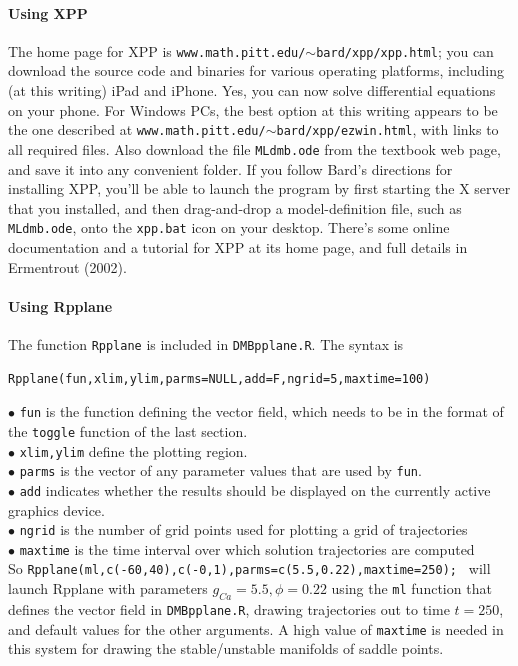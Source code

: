 \documentclass [11pt]{article}
\newcommand{\blst}{\vspace{-0.035in} \begin{lstlisting}}
\newcommand{\ttt}[1]{\texttt{#1}}
\numberwithin{exercise}{section}
\begin{document}
\paragraph{Using XPP} The home page for XPP is \ttt{www.math.pitt.edu/$\sim$bard/xpp/xpp.html}; you
can download the source code and binaries for various operating platforms, including (at this
writing) iPad and iPhone. Yes, you can now solve differential equations on your phone. 
For Windows PCs, the best option at this writing appears to be 
the one described at \ttt{www.math.pitt.edu/$\sim$bard/xpp/ezwin.html}, with links to all required files. 
Also download the file \ttt{MLdmb.ode} from the textbook web page, and save it into any convenient folder.  
If you follow Bard's directions for installing XPP, you'll be able to launch the program by first starting
the X server that you installed, and then drag-and-drop a model-definition file, such as \ttt{MLdmb.ode}, onto the \ttt{xpp.bat} icon on your desktop. There's some online documentation and a tutorial for XPP at its home page, and full details in
Ermentrout (2002). 

\paragraph{Using Rpplane} The function \ttt{Rpplane} is included in \ttt{DMBpplane.R}. The syntax is
\blst
Rpplane(fun,xlim,ylim,parms=NULL,add=F,ngrid=5,maxtime=100)
\end{lstlisting}
$\bullet$ \ttt{fun} is the function defining the vector field, which needs to be in the format of 
the \ttt{toggle} function of the last section. \\
$\bullet$ \ttt{xlim,ylim} define the plotting region. \\
$\bullet$ \ttt{parms} is the vector of any parameter values that are used by \ttt{fun}. \\
$\bullet$ \ttt{add} indicates whether the results should be displayed on the currently active graphics device. \\
$\bullet$ \ttt{ngrid} is the number of grid points used for plotting a grid of trajectories \\
$\bullet$ \ttt{maxtime} is the time interval over which solution trajectories are computed \\

So \ttt{Rpplane(ml,c(-60,40),c(-0,1),parms=c(5.5,0.22),maxtime=250); }
will launch Rpplane with parameters $g_{Ca}=5.5,\phi=0.22$ using the \ttt{ml} function that
defines the vector field in \ttt{DMBpplane.R}, drawing trajectories out to time $t=250$, and 
default values for the other arguments. A high value of \ttt{maxtime} is needed in this system 
for drawing the stable/unstable manifolds of saddle points. 
\end{document}
